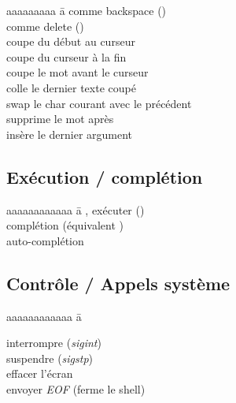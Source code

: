 \documentclass{article}
\let\oldkeys\keys
\renewcommand{\keys}[1]{\small\oldkeys{#1}\normalsize}
\begin{document}
\begin{multicols}{4}
    \begin{tabbing}
        aaaaaaaaa \= a \kill
         \> comme backspace (\keys{\backspace})    \\
         \> comme delete (\keys{\del})             \\
         \> coupe du début au curseur              \\
         \> coupe du curseur à la fin              \\
         \> coupe le mot avant le curseur          \\
         \> colle le dernier texte coupé           \\
         \> swap le char courant avec le précédent \\
          \> supprime le mot après                  \\
          \> insère le dernier argument
    \end{tabbing}

    \subsection*{Exécution / complétion}

    \begin{tabbing}
        aaaaaaaaaaaa \= a \kill
        ,  exécuter (\keys{\return}) \\
         \> complétion (équivalent \keys{\tab})                           \\
        \keys{\tab}{}    \> auto-complétion
    \end{tabbing}

    \subsection*{Contrôle / Appels système}

    \begin{tabbing}
        aaaaaaaaaaaa \= a \kill

         \> interrompre (\emph{sigint})         \\
         \> suspendre (\emph{sigstp})           \\
         \> effacer l'écran                     \\
         \> envoyer \emph{EOF} (ferme le shell)
    \end{tabbing}




\end{multicols}
\end{document}
